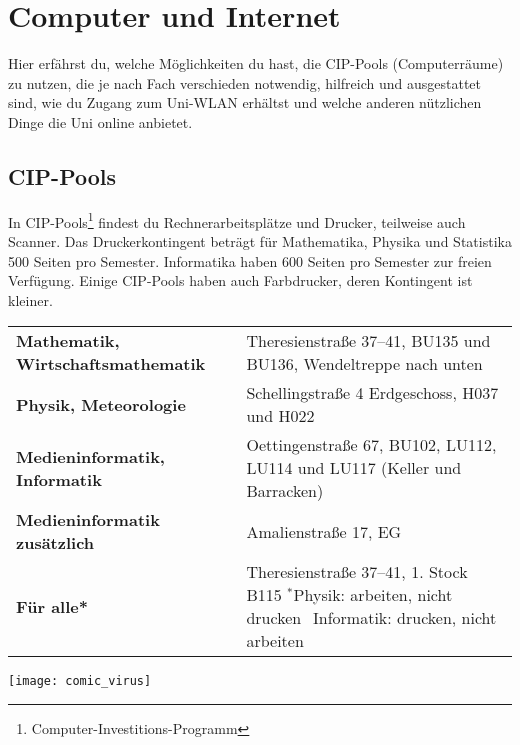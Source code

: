 ﻿\chapter{Computer und Internet}
Hier erfährst du, welche Möglichkeiten du hast, die CIP-Pools (Computerräume) zu nutzen, die je nach Fach verschieden notwendig, hilfreich und ausgestattet sind, wie du Zugang zum Uni-WLAN erhältst 
und welche anderen nützlichen Dinge die Uni online anbietet.

\section{CIP-Pools}
In CIP-Pools\footnote{Computer-Investitions-Programm} findest du Rechnerarbeitsplätze und Drucker, teilweise auch Scanner. Das Druckerkontingent beträgt für Mathematika, Physika und Statistika 500 Seiten pro Semester. Informatika haben 600 Seiten pro Semester zur freien Verfügung. Einige CIP-Pools haben auch Farbdrucker, deren Kontingent ist kleiner.

\begin{tabularx}{\linewidth}{lX}
\textbf{Mathematik, Wirtschaftsmathematik} %
& Theresienstraße 37--41, BU135 und BU136, Wendeltreppe nach unten\\
\textbf{Physik, Meteorologie} %
& Schellingstraße 4 Erdgeschoss, H037 und H022\\
\textbf{Medieninformatik, Informatik}  %
& Oettingenstraße 67, BU102, LU112, LU114 und LU117 (Keller und Barracken)\\
\textbf{Medieninformatik zusätzlich} %
& Amalienstraße 17, EG\\
\textbf{Für alle*}    %
& Theresienstraße 37--41, 1. Stock B115 \newline
\footnotesize{$^*$Physik: arbeiten, nicht drucken \newline $\phantom{^*}$Informatik: drucken, nicht arbeiten}
\end{tabularx}

\begin{center}
	{\texttt{[image: comic\_virus]}}
\end{center}

